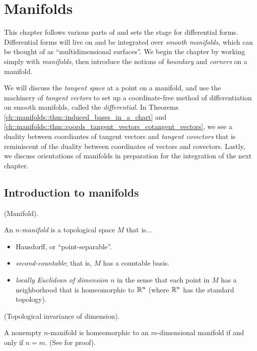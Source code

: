 \chapter{Manifolds}
\label{ch::manifolds}

This chapter follows various parts of \cite{book::SM} and sets the stage for differential forms. Differential forms will live on and be integrated over \textit{smooth manifolds}, which can be thought of as ``multidimensional surfaces''. We begin the chapter by working simply with \textit{manifolds}, then introduce the notions of \textit{boundary} and \textit{corners} on a manifold.

We will discuss the \textit{tangent space} at a point on a manifold, and use the machinery of \textit{tangent vectors} to set up a coordinate-free method of differentiation on smooth manifolds, called the \textit{differential}. In Theorems \ref{ch::manifolds::thm::induced_bases_in_a_chart} and \ref{ch::manifolds::thm::coords_tangent_vectors_cotangent_vectors}, we see a duality between coordiantes of tangent vectors and \textit{tangent covectors} that is reminiscent of the duality between coordinates of vectors and covectors. Lastly, we discuss orientations of manifolds in preparation for the integration of the next chapter.
\section{Introduction to manifolds}

\begin{defn}
    \label{ch::manifolds::defn::manifold}
    
     (Manifold). 
    
    An \textit{$n$-manifold} is a topological space $M$ that is...
    
    \begin{itemize}
        \item Hausdorff, or ``point-separable''.
        \item \textit{second-countable}; that is, $M$ has a countable basis.
        \item \textit{locally Euclidean of dimension $n$} in the sense that each point in $M$ has a neighborhood that is homeomorphic to $\mathbb{R}^n$ (where $\mathbb{R}^n$ has the standard topology).
    \end{itemize}
\end{defn}

\begin{theorem}
     (Topological invariance of dimension).
    
    A nonempty $n$-manifold is homeomorphic to an $m$-dimensional manifold if and only if $n = m$. (See \cite{book::SM} for proof).
\end{theorem}

